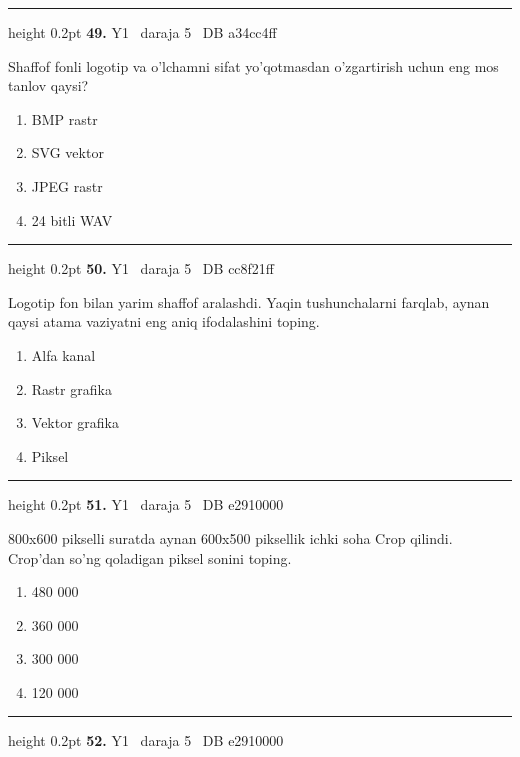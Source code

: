 \documentclass[10pt,a4paper,oneside]{article}
\begin{document}
\vspace{2mm}\hrule height 0.2pt \vspace{4mm}
\hypertarget{q49}{\textbf{\color{ink}49.}}  {\color{muted}\scriptsize Y1 \textbullet\ daraja 5 \textbullet\ DB a34cc4ff}
\par
Shaffof fonli logotip va o'lchamni sifat yo'qotmasdan o'zgartirish uchun eng mos tanlov qaysi?
\begin{enumerate}[label=\Alph*),leftmargin=9mm]
\item BMP rastr
\item SVG vektor
\item JPEG rastr
\item 24 bitli WAV
\end{enumerate}
\vspace{2mm}\hrule height 0.2pt \vspace{4mm}
\hypertarget{q50}{\textbf{\color{ink}50.}}  {\color{muted}\scriptsize Y1 \textbullet\ daraja 5 \textbullet\ DB cc8f21ff}
\par
Logotip fon bilan yarim shaffof aralashdi. Yaqin tushunchalarni farqlab, aynan qaysi atama vaziyatni eng aniq ifodalashini toping.
\begin{enumerate}[label=\Alph*),leftmargin=9mm]
\item Alfa kanal
\item Rastr grafika
\item Vektor grafika
\item Piksel
\end{enumerate}
\vspace{2mm}\hrule height 0.2pt \vspace{4mm}
\hypertarget{q51}{\textbf{\color{ink}51.}}  {\color{muted}\scriptsize Y1 \textbullet\ daraja 5 \textbullet\ DB e2910000}
\par
800x600 pikselli suratda aynan 600x500 piksellik ichki soha Crop qilindi. Crop'dan so'ng qoladigan piksel sonini toping.
\begin{enumerate}[label=\Alph*),leftmargin=9mm]
\item 480 000
\item 360 000
\item 300 000
\item 120 000
\end{enumerate}
\vspace{2mm}\hrule height 0.2pt \vspace{4mm}
\hypertarget{q52}{\textbf{\color{ink}52.}}  {\color{muted}\scriptsize Y1 \textbullet\ daraja 5 \textbullet\ DB e2910000}
\end{document}
